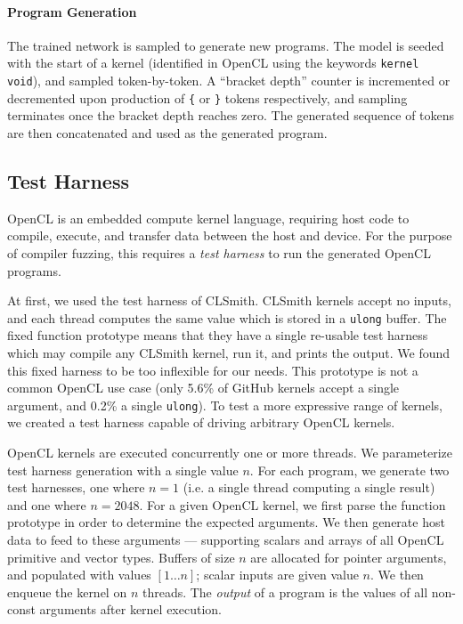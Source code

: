 \paragraph{Program Generation} The trained network is sampled to generate new programs. The model is seeded with the start of a kernel (identified in OpenCL using the keywords \texttt{kernel void}), and sampled token-by-token. A ``bracket depth'' counter is incremented or decremented upon production of \texttt{\{} or \texttt{\}} tokens respectively, and sampling terminates once the bracket depth reaches zero. The generated sequence of tokens are then concatenated and used as the generated program.



\subsection{Test Harness}


OpenCL is an embedded compute kernel language, requiring host code to compile, execute, and transfer data between the host and device. For the purpose of compiler fuzzing, this requires a \emph{test harness} to run the generated OpenCL programs.

At first, we used the test harness of CLSmith. CLSmith kernels accept no inputs, and each thread computes the same value which is stored in a \texttt{ulong} buffer. The fixed function prototype means that they have a single re-usable test harness which may compile any CLSmith kernel, run it, and prints the output. We found this fixed harness to be too inflexible for our needs. This prototype is not a common OpenCL use case (only 5.6\% of GitHub kernels accept a single argument, and 0.2\% a single \texttt{ulong}).
To test a more expressive range of kernels, we created a test harness capable of driving arbitrary OpenCL kernels.

OpenCL kernels are executed concurrently one or more threads. We parameterize test harness generation with a single value $n$. For each program, we generate two test harnesses, one where $n=1$ (i.e. a single thread computing a single result) and one where $n = 2048$. For a given OpenCL kernel, we first parse the function prototype in order to determine the expected arguments. We then generate host data to feed to these arguments --- supporting scalars and arrays of all OpenCL primitive and vector types. Buffers of size $n$ are allocated for pointer arguments, and populated with values {$[1 \ldots n]$}; scalar inputs are given value $n$. We then enqueue the kernel on $n$ threads. The \emph{output} of a program is the values of all non-const arguments after kernel execution.

